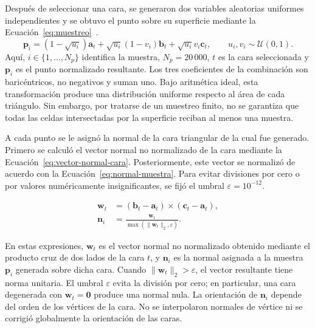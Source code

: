 Después de seleccionar una cara, se generaron dos variables aleatorias uniformes independientes y se obtuvo el punto sobre su superficie mediante la Ecuación~\eqref{eq:muestreo}~\parencite{pbrt}.
\begin{equation}
\mathbf p_i=
(1-\sqrt{u_i})\mathbf a_t
+
\sqrt{u_i}(1-v_i)\mathbf b_t
+
\sqrt{u_i}v_i\mathbf c_t,
\qquad
u_i,v_i\sim\mathcal U(0,1).
\label{eq:muestreo}
\end{equation}
Aquí, $i\in\{1,\ldots,N_p\}$ identifica la muestra, $N_p=20\,000$, $t$ es la cara seleccionada y $\mathbf p_i$ es el punto normalizado resultante. Los tres coeficientes de la combinación son baricéntricos, no negativos y suman uno. Bajo aritmética ideal, esta transformación produce una distribución uniforme respecto al área de cada triángulo. Sin embargo, por tratarse de un muestreo finito, no se garantiza que todas las celdas intersectadas por la superficie reciban al menos una muestra.

A cada punto se le asignó la normal de la cara triangular de la cual
fue generado. Primero se calculó el vector normal no normalizado de
la cara mediante la Ecuación~\eqref{eq:vector-normal-cara}.
Posteriormente, este vector se normalizó de acuerdo con la
Ecuación~\eqref{eq:normal-muestra}. Para evitar divisiones por cero o
por valores numéricamente insignificantes, se fijó el umbral
$\varepsilon=10^{-12}$.

\begin{subequations}\label{eq:normalcara}
\begin{align}
\mathbf w_t
&=
(\mathbf b_t-\mathbf a_t)
\times
(\mathbf c_t-\mathbf a_t),
\label{eq:vector-normal-cara}\\
\mathbf n_i
&=
\frac{\mathbf w_t}
{\max\left(\|\mathbf w_t\|_2,\varepsilon\right)}.
\label{eq:normal-muestra}
\end{align}
\end{subequations}

En estas expresiones, $\mathbf w_t$ es el vector normal no normalizado
obtenido mediante el producto cruz de dos lados de la cara $t$, y
$\mathbf n_i$ es la normal asignada a la muestra $\mathbf p_i$
generada sobre dicha cara. Cuando
$\|\mathbf w_t\|_2>\varepsilon$, el vector resultante tiene norma
unitaria. El umbral $\varepsilon$ evita la división por cero; en
particular, una cara degenerada con $\mathbf w_t=\mathbf 0$ produce
una normal nula. La orientación de $\mathbf n_i$ depende del orden de
los vértices de la cara. No se interpolaron normales de vértice ni se
corrigió globalmente la orientación de las caras.

